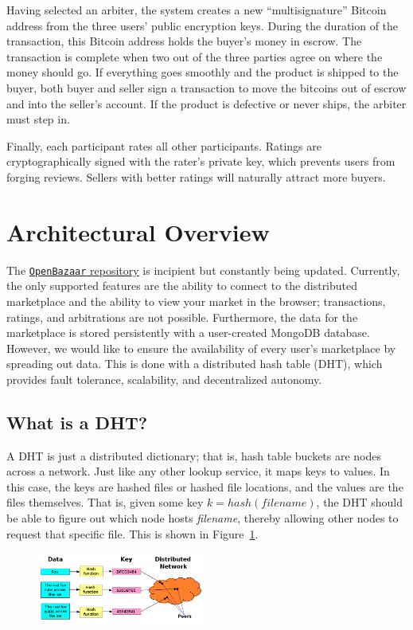 \documentclass[12pt,twocolumn]{article}
\begin{document}
Having selected an arbiter, the system creates a new ``multisignature'' Bitcoin address from the three users' public encryption keys.
During the duration of the transaction, this Bitcoin address holds the buyer's money in escrow.
The transaction is complete when two out of the three parties agree on where the money should go.
If everything goes smoothly and the product is shipped to the buyer, both buyer and seller sign a transaction to move the bitcoins out of escrow and into the seller's account.
If the product is defective or never ships, the arbiter must step in.

Finally, each participant rates all other participants.
Ratings are cryptographically signed with the rater's private key, which prevents users from forging reviews.
Sellers with better ratings will naturally attract more buyers. 

\section{Architectural Overview}
The \href{https://github.com/OpenBazaar/OpenBazaar}{{\tt OpenBazaar} repository} is incipient but constantly being updated.
Currently, the only supported features are the ability to connect to the distributed marketplace and the ability to view your market in the browser; transactions, ratings, and arbitrations are not possible.
Furthermore, the data for the marketplace is stored persistently with a user-created MongoDB database.
However, we would like to ensure the availability of every user's marketplace by spreading out data.
This is done with a distributed hash table (DHT), which provides fault tolerance, scalability, and decentralized autonomy.

\subsection{What is a DHT?}
\newcommand{\kv}{}
\def\kv/{$\langle$key,value$\rangle$}
A DHT is just a distributed dictionary; that is, hash table buckets are nodes across a network.
Just like any other lookup service, it maps keys to values.
In this case, the keys are hashed files or hashed file locations, and the values are the files themselves.
That is, given some key $k = hash(filename)$, the DHT should be able to figure out which node hosts \emph{filename}, thereby allowing other nodes to request that specific file.
This is shown in Figure~\ref{DHT}.

\begin{figure}[h!]
  \centering
  \includegraphics[width=0.5\textwidth]{images/DHT.png}
  \caption{\label{DHT}}
\end{figure}
\end{document}
